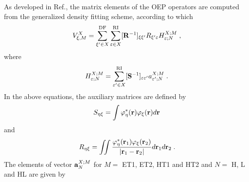 As developed in Ref.\cite{Blasiak.Bednarska.Choluj.Bartkowiak.XXXX}, 
the matrix elements of the OEP operators
are computed from the generalized density fitting scheme, according to which
%
\begin{equation}\label{e:a:voep}
 V^X_{\xi, M} = \sum_{\xi'\in X}^{\rm DF} 
                \sum_{\varepsilon\in X}^{\rm RI}
                [{\bf R}^{-1}]_{\xi\xi'} R_{\xi'\varepsilon} H^{X;M}_{\varepsilon; N} \;,
\end{equation}
%
where
%
\begin{equation}
 H^{X;M}_{\varepsilon; N} = \sum_{\varepsilon'\in X}^{\rm RI}
                        [{\bf S}^{-1}]_{\varepsilon\varepsilon'} a_{\varepsilon';N}^{X; M} \;.
\end{equation}
%
In the above equations, the auxiliary matrices are defined by
%
\begin{equation}
 S_{\eta\xi}  = \int 
                       \varphi^*_\eta({\bf r}) \varphi_\xi({\bf r}) 
                 d{\bf r} 
\end{equation}
%
and
%
\begin{equation}
 R_{\eta\xi}  = \iint 
                       \frac{ \varphi^*_\eta({\bf r}_1) \varphi_\xi({\bf r}_2) } 
                            {\vert {\bf r}_1 - {\bf r}_2\vert}  
                 d{\bf r}_1 d{\bf r}_2 \;.
\end{equation}
%
The elements of vector ${\bf a}^{X;M}_N$ for $M=$ ET1, ET2, HT1 and HT2 and $N=$ H, L and HL are given by
%

